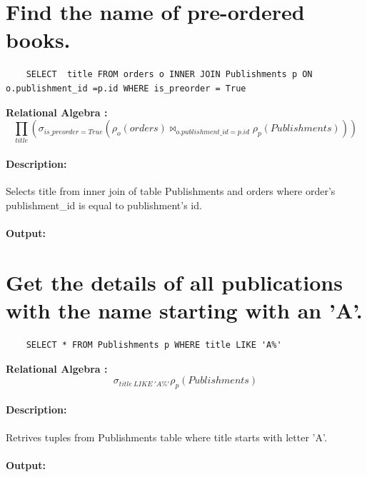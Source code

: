 \documentclass{report}
\begin{document}




\section{Find the name of pre-ordered books.}

\begin{lstlisting}
    SELECT  title FROM orders o INNER JOIN Publishments p ON o.publishment_id =p.id WHERE is_preorder = True
\end{lstlisting}
\vspace{0.5cm}
\textbf{Relational Algebra :} \[ \prod_{title}( \sigma_{is\_preorder = True} (   \rho_o(orders) \bowtie_{o.publishment\_id = p.id}  \rho_p(Publishments)))   \]
\paragraph{Description: }
Selects title from inner join of table Publishments and orders where order's publishment\_id is equal to publishment's id.

\paragraph{Output: }





\section{Get the details of all publications with the name starting with an 'A'.}

\begin{lstlisting}
    SELECT * FROM Publishments p WHERE title LIKE 'A%'
\end{lstlisting}
\vspace{0.5cm}
\textbf{Relational Algebra :} \[ \sigma_{title\ LIKE\ 'A\%'}  \rho_p(Publishments)  \]
\paragraph{Description: }
Retrives tuples from Publishments table where title starts with letter 'A'.

\paragraph{Output: }


\end{document}
